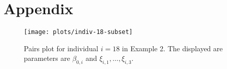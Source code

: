 \documentclass[
  10pt,
  a4paper,
]{article}
\begin{document}
\newpage

\hypertarget{appendix}{%
\section*{Appendix}\label{appendix}}

\begin{figure}
\texttt{[image: plots/indiv-18-subset]} \caption{Pairs plot for individual $i = 18$ in Example 2. The displayed are parameters are $\beta_{0, i}$ and $\xi_{i, 1}, \ldots, \xi_{i, 3}$.}\label{fig:coef_pairs}
\end{figure}
\end{document}
